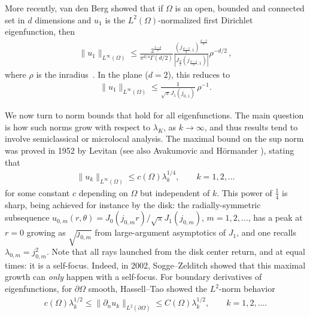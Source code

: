 \documentclass{amsart}
\newcommand{\pO}{{\partial\Omega}}
\theoremstyle{plain}
\begin{document}
More recently, van den Berg showed that if $\Omega$ is an open, bounded and connected set in $d$ dimensions and $u_1$ is the $L^2(\Omega)$-normalized first Dirichlet eigenfunction, then
\begin{align}
\|u_1 \|_{L^\infty(\Omega)}
\le \frac{2^{\frac{2-d}{2}}}{\pi^{d/4}\Gamma(d/2)} \frac{\left( j_{\frac{d-2}{2},1}\right)^{\frac{d-2}{2}}}{\left|J_{\frac{d}{2}}\left(j_{\frac{d-2}{2},1}\right)\right|} \rho^{-d/2}\,,
\end{align}
where $\rho$ is the inradius~\cite{van2000norm}. In the plane ($d=2$), this reduces to 
\begin{align}
\|u_1 \|_{L^\infty(\Omega)} \le \frac{1}{\sqrt{\pi} J_1(j_{0,1})}\,\rho^{-1}.
\label{Berg2d}
\end{align}

We now turn to norm bounds that hold for all eigenfunctions.
The main question is how such norms grow with respect to $\lambda_K$,
as $k\to\infty$, and thus results tend to involve semiclassical or microlocal analysis.
The maximal bound on the sup norm was proved
in 1952 by Levitan \cite{levitan1952asymptotic} (see also Avakumovic \cite{avakumovic1956eigenfunktionen} and H\"{o}rmander \cite{hormander1968riesz}),
stating that
\begin{align}
  \|u_k\|_{L^\infty(\Omega)} \le c(\Omega) \lambda_k^{1/4}, \qquad k=1,2,\dots
  \label{maximal}
\end{align}
for some constant $c$ depending on $\Omega$ but independent of $k$.
This power of $\frac{1}{4}$ is sharp,
being achieved for instance by the disk:
the radially-symmetric subsequence
$u_{0,m}(r,\theta) = J_0(j_{0,m}r)/\sqrt{\pi}J_1(j_{0,m})$, $m=1,2,\dots$,
has a peak at $r=0$ growing as $\sqrt{j_{0,m}}$ from
large-argument asymptotics of $J_1$,
and one recalls $\lambda_{0,m} = j_{0,m}^2$.
Note that all rays launched from the disk center
return, and at equal times: it is a self-focus.
Indeed, in 2002, Sogge--Zelditch \cite{SZ02} showed that this maximal growth can
{\em only} happen with a self-focus.
For boundary derivatives of eigenfunctions, for $\pO$ smooth,
Hassell--Tao \cite{hassell2002upper} showed the $L^2$-norm behavior
\begin{align}
  c(\Omega)\lambda_k^{1/2} \le \|\partial_n u_k\|_{L^2(\partial \Omega)} \le C(\Omega) \lambda_k^{1/2},
  \qquad k=1,2,\dots.
\end{align}
\end{document}
